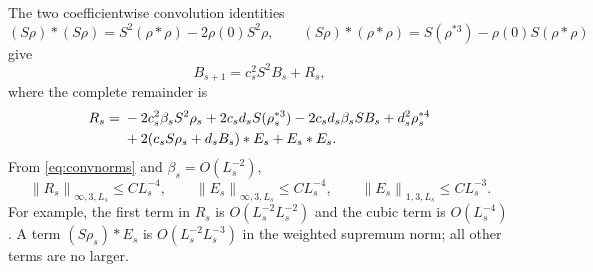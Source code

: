 \documentclass[11pt,letterpaper,reqno]{amsart}
\theoremstyle{plain}
\newcommand{\norm}[1]{\left\lVert#1\right\rVert}
\begin{document}
The two coefficientwise convolution identities
\[
 (S\rho)*(S\rho)=S^2(\rho*\rho)-2\rho(0)S^2\rho,
 \qquad (S\rho)*(\rho*\rho)=S(\rho^{*3})-\rho(0)S(\rho*\rho)
\]
give
\begin{equation}\label{eq:Bevolution}
 B_{s+1}=c_s^2S^2B_s+R_s,
\end{equation}
where the complete remainder is
\begin{align}\label{eq:R}
 R_s={}&-2c_s^2\beta_sS^2\rho_s
 +2c_sd_sS(\rho_s^{*3})-2c_sd_s\beta_sSB_s+d_s^2\rho_s^{*4}\notag\\
 &+2(c_sS\rho_s+d_sB_s)*E_s+E_s*E_s.
\end{align}
From \eqref{eq:convnorms} and $\beta_s=O(L_s^{-2})$,
\begin{equation}\label{eq:REbounds}
 \norm{R_s}_{\infty,3,L_s}\le CL_s^{-4},\qquad
 \norm{E_s}_{\infty,3,L_s}\le CL_s^{-4},\qquad
 \norm{E_s}_{1,3,L_s}\le CL_s^{-3}.
\end{equation}
For example, the first term in $R_s$ is $O(L_s^{-2}L_s^{-2})$ and the cubic term is $O(L_s^{-4})$. A term $(S\rho_s)*E_s$ is $O(L_s^{-2}L_s^{-3})$ in the weighted supremum norm; all other terms are no larger.
\end{document}
